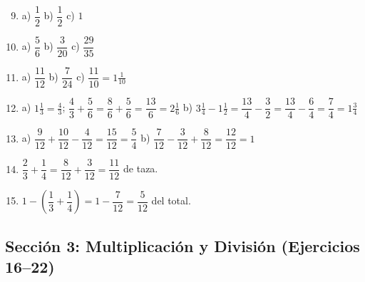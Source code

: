 \documentclass[12pt, letterpaper]{article}
\begin{document}
  \begin{enumerate}[leftmargin=*, label=\textbf{\arabic*.}]
    \setcounter{enumi}{8}
    \item a) $\dfrac{1}{2}$ \quad b) $\dfrac{1}{2}$ \quad c) $1$

    \item a) $\dfrac{5}{6}$ \quad b) $\dfrac{3}{20}$ \quad c) $\dfrac{29}{35}$

    \item a) $\dfrac{11}{12}$ \quad b) $\dfrac{7}{24}$ \quad c) $\dfrac{11}{10} = 1\frac{1}{10}$

    \item a) $1\frac{1}{3} = \frac{4}{3}$; $\dfrac{4}{3} + \dfrac{5}{6} = \dfrac{8}{6} + \dfrac{5}{6} = \dfrac{13}{6} = 2\frac{1}{6}$ \quad b) $3\frac{1}{4} - 1\frac{1}{2} = \dfrac{13}{4} - \dfrac{3}{2} = \dfrac{13}{4} - \dfrac{6}{4} = \dfrac{7}{4} = 1\frac{3}{4}$

    \item a) $\dfrac{9}{12} + \dfrac{10}{12} - \dfrac{4}{12} = \dfrac{15}{12} = \dfrac{5}{4}$ \quad b) $\dfrac{7}{12} - \dfrac{3}{12} + \dfrac{8}{12} = \dfrac{12}{12} = 1$

    \item $\dfrac{2}{3} + \dfrac{1}{4} = \dfrac{8}{12} + \dfrac{3}{12} = \dfrac{11}{12}$ de taza.

    \item $1 - \left(\dfrac{1}{3} + \dfrac{1}{4}\right) = 1 - \dfrac{7}{12} = \dfrac{5}{12}$ del total.
  \end{enumerate}

  \newpage

  \subsection*{Sección 3: Multiplicación y División (Ejercicios 16--22)}
\end{document}
